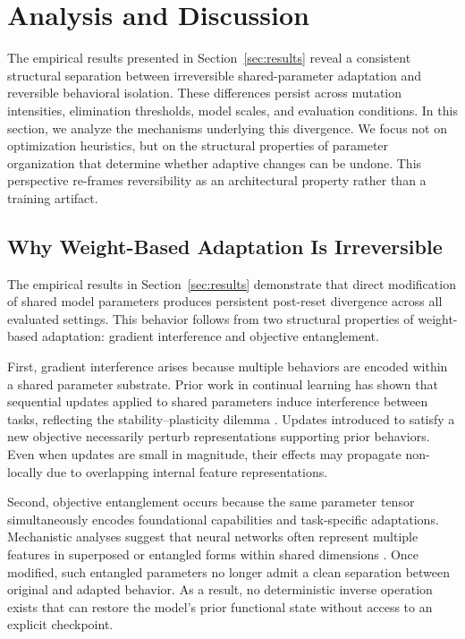 \documentclass{article}
\begin{document}
	
	\section{Analysis and Discussion}
	\label{sec:analysis}
	
	The empirical results presented in Section~\ref{sec:results} reveal a consistent structural separation between irreversible shared-parameter adaptation and reversible behavioral isolation. These differences persist across mutation intensities, elimination thresholds, model scales, and evaluation conditions. In this section, we analyze the mechanisms underlying this divergence. We focus not on optimization heuristics, but on the structural properties of parameter organization that determine whether adaptive changes can be undone. This perspective re-frames reversibility as an architectural property rather than a training artifact.
	
	\subsection{Why Weight-Based Adaptation Is Irreversible}
	\label{sec:analysis_irreversibility}
	
	The empirical results in Section~\ref{sec:results} demonstrate that direct modification of shared model parameters produces persistent post-reset divergence across all evaluated settings. This behavior follows from two structural properties of weight-based adaptation: gradient interference and objective entanglement.
	
	First, gradient interference arises because multiple behaviors are encoded within a shared parameter substrate. Prior work in continual learning has shown that sequential updates applied to shared parameters induce interference between tasks, reflecting the stability--plasticity dilemma \cite{kirkpatrick2017ewc,delange2021continual}. Updates introduced to satisfy a new objective necessarily perturb representations supporting prior behaviors. Even when updates are small in magnitude, their effects may propagate non-locally due to overlapping internal feature representations.
	
	Second, objective entanglement occurs because the same parameter tensor simultaneously encodes foundational capabilities and task-specific adaptations. Mechanistic analyses suggest that neural networks often represent multiple features in superposed or entangled forms within shared dimensions \cite{elhage2022superposition}. Once modified, such entangled parameters no longer admit a clean separation between original and adapted behavior. As a result, no deterministic inverse operation exists that can restore the model’s prior functional state without access to an explicit checkpoint.
	
\end{document}
